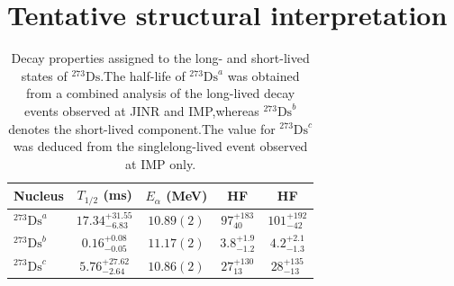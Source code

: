 \documentclass[11pt]{article}
\begin{document}
\section*{Tentative structural interpretation}

\begin{table}[htbp]
\centering
\caption{Decay properties assigned to the long- and short-lived states of $^{273}\mathrm{Ds}$.The half-life of $^{273}\mathrm{Ds}^{a}$ was obtained from a combined analysis of the long-lived decay events observed at JINR and IMP,whereas $^{273}\mathrm{Ds}^{b}$ denotes the short-lived component.The value for $^{273}\mathrm{Ds}^{c}$ was deduced from the singlelong-lived event observed at IMP only.}
\label{tab:decay_properties}
\begingroup
\renewcommand{\arraystretch}{1.22}
\setlength{\tabcolsep}{7pt}
\begin{tabular*}{0.92\textwidth}{@{\extracolsep{\fill}}lcccc@{}}
\toprule
Nucleus
& \shortstack{$T_{1/2}$\\(\si{\milli\second})}
& \shortstack{$E_{\alpha}$\\(\si{\mega\electronvolt})}
& \shortstack{HF\\ \cite{HFPoenaru,HFE}}
& \shortstack{HF\\ \cite{HFVs}}
\\
\midrule

$^{273}\mathrm{Ds}^{a}$
& $17.34^{+31.55}_{-6.83}$
& $10.89(2)$
& $97^{+183}_{40}$
& $101^{+192}_{-42}$
\\
\addlinespace[0.25em]

$^{273}\mathrm{Ds}^{b}$
& $0.16^{+0.08}_{-0.05}$
& $11.17(2)$
& $3.8^{+1.9}_{-1.2}$
& $4.2^{+2.1}_{-1.3}$
\\
\addlinespace[0.25em]

$^{273}\mathrm{Ds}^{c}$
& $5.76^{+27.62}_{-2.64}$
& $10.86(2)$
& $27^{+130}_{13}$
& $28^{+135}_{-13}$
\\



\bottomrule
\end{tabular*}
\endgroup
\end{table}
\end{document}
